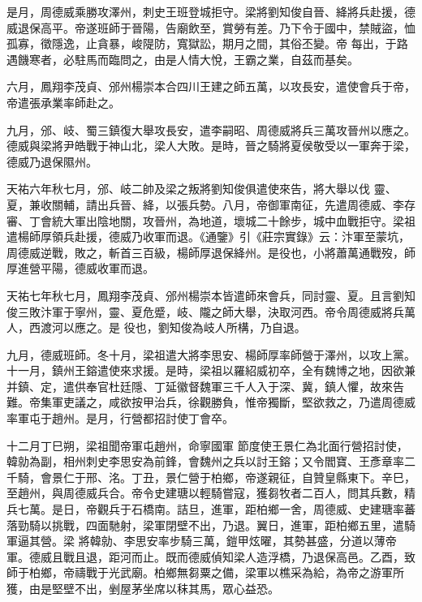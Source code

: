 \begin{pinyinscope}
 是月，周德威乘勝攻澤州，刺史王班登城拒守。梁將劉知俊自晉、絳將兵赴援，德威退保高平。帝遂班師于晉陽，告廟飲至，賞勞有差。乃下令于國中，禁賊盜，恤孤寡，徵隱逸，止貪暴，峻隄防，寬獄訟，期月之間，其俗丕變。帝
 每出，于路遇饑寒者，必駐馬而臨問之，由是人情大悅，王霸之業，自茲而基矣。



 六月，鳳翔李茂貞、邠州楊崇本合四川王建之師五萬，以攻長安，遣使會兵于帝，帝遣張承業率師赴之。



 九月，邠、岐、蜀三鎮復大舉攻長安，遣李嗣昭、周德威將兵三萬攻晉州以應之。德威與梁將尹皓戰于神山北，梁人大敗。是時，晉之騎將夏侯敬受以一軍奔于梁，德威乃退保隰州。



 天祐六年秋七月，邠、岐二帥及梁之叛將劉知俊俱遣使來告，將大舉以伐
 靈、夏，兼收關輔，請出兵晉、絳，以張兵勢。八月，帝御軍南征，先遣周德威、李存審、丁會統大軍出陰地關，攻晉州，為地道，壞城二十餘步，城中血戰拒守。梁祖遣楊師厚領兵赴援，德威乃收軍而退。《通鑒》引《莊宗實錄》云：汴軍至蒙坑，周德威逆戰，敗之，斬首三百級，楊師厚退保絳州。是役也，小將蕭萬通戰歿，師厚進營平陽，德威收軍而退。



 天祐七年秋七月，鳳翔李茂貞、邠州楊崇本皆遣師來會兵，同討靈、夏。且言劉知俊三敗汴軍于寧州，靈、夏危蹙，岐、隴之師大舉，決取河西。帝令周德威將兵萬人，西渡河以應之。是
 役也，劉知俊為岐人所構，乃自退。



 九月，德威班師。冬十月，梁祖遣大將李思安、楊師厚率師營于澤州，以攻上黨。十一月，鎮州王鎔遣使來求援。是時，梁祖以羅紹威初卒，全有魏博之地，因欲兼并鎮、定，遣供奉官杜廷隱、丁延徽督魏軍三千人入于深、冀，鎮人懼，故來告難。帝集軍吏議之，咸欲按甲治兵，徐觀勝負，惟帝獨斷，堅欲救之，乃遣周德威率軍屯于趙州。是月，行營都招討使丁會卒。



 十二月丁巳朔，梁祖聞帝軍屯趙州，命寧國軍
 節度使王景仁為北面行營招討使，韓勍為副，相州刺史李思安為前鋒，會魏州之兵以討王鎔；又令閻寶、王彥章率二千騎，會景仁于邢、洺。丁丑，景仁營于柏鄉，帝遂親征，自贊皇縣東下。辛巳，至趙州，與周德威兵合。帝令史建瑭以輕騎嘗寇，獲芻牧者二百人，問其兵數，精兵七萬。是日，帝觀兵于石橋南。詰旦，進軍，距柏鄉一舍，周德威、史建瑭率蕃落勁騎以挑戰，四面馳射，梁軍閉壁不出，乃退。翼日，進軍，距柏鄉五里，遣騎軍逼其營。梁
 將韓勍、李思安率步騎三萬，鎧甲炫曜，其勢甚盛，分道以薄帝軍。德威且戰且退，距河而止。既而德威偵知梁人造浮橋，乃退保高邑。乙酉，致師于柏鄉，帝禱戰于光武廟。柏鄉無芻粟之備，梁軍以樵采為給，為帝之游軍所獲，由是堅壁不出，剉屋茅坐席以秣其馬，眾心益恐。




\end{pinyinscope}
